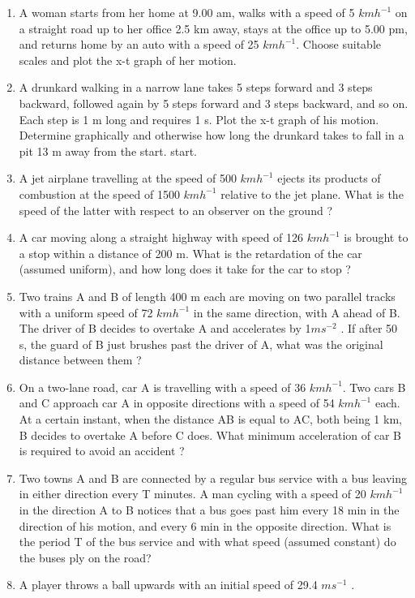 \begin{enumerate}[label=\arabic*.,ref=\thesection.\theenumi]
\item A woman starts from her home at 9.00 am, walks with a speed of 5 $km h^{-1}$ on a straight road up to her office 2.5 km away, stays at the office up to 5.00 pm, and returns home by an auto with a speed of 25 $km h^{-1}$. Choose suitable scales and plot the x-t graph of her motion.
\item A drunkard walking in a narrow lane takes 5 steps forward and 3 steps backward, followed again by 5 steps forward and 3 steps backward, and so on. Each step is 1 m long and requires 1 s. Plot the x-t graph of his motion. Determine graphically and otherwise how long the drunkard takes to fall in a pit 13 m away from the start.
start.
\item A jet airplane travelling at the speed of 500 $km h^{-1}$ ejects its products of combustion at the speed of 1500 $km h^{-1}$ relative to the jet plane. What is the speed of the latter with respect to an observer on the ground ?
\item A car moving along a straight highway with speed of 126 $km h^{-1}$ is brought to a stop within a distance of 200 m. What is the retardation of the car (assumed uniform), and how long does it take for the car to stop ?
\item Two trains A and B of length 400 m each are moving on two parallel tracks with a uniform speed of 72 $km h^{-1}$ in the same direction, with A ahead of B. The driver of B decides to overtake A and accelerates by 1$ m s^{-2}$
. If after 50 s, the guard of B just brushes past the driver of A, what was the original distance between them ?
\item  On a two-lane road, car A is travelling with a speed of 36 $km h^{-1}$. Two cars B and C approach car A in opposite directions with a speed of 54 $km h^{-1}$ each. At a certain instant, when the distance AB is equal to AC, both being 1 km, B decides to overtake A before C does. What minimum acceleration of car B is required to avoid an accident ?
\item Two towns A and B are connected by a regular bus service with a bus leaving in either direction every T minutes. A man cycling with a speed of 20 $km h^{-1}$ in the direction A to B notices that a bus goes past him every 18 min in the direction of his motion, and every 6 min in the opposite direction. What is the period T of the bus service and with what speed (assumed constant) do the buses ply on the road?
\item  A player throws a ball upwards with an initial speed of 29.4 $m s^{-1}$ .

\end{enumerate}

